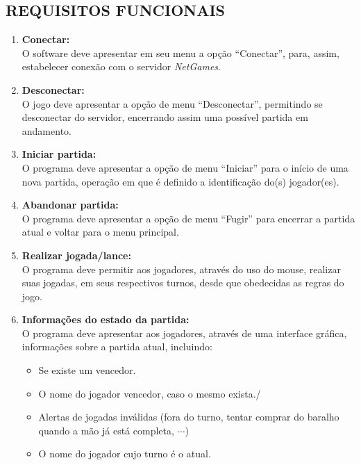 \documentclass[12pt,a4paper,brazil,abntex2]{article}
\begin{document}
	\subsection{\normalsize REQUISITOS FUNCIONAIS}
		
		\begin{enumerate}
			\item {\bf Conectar:}\\
				O software deve apresentar em seu menu a opção ``Conectar'', para, assim, estabelecer conexão com o servidor \textit{NetGames}.

			\item {\bf Desconectar:}\\
				O jogo deve apresentar a opção de menu ``Desconectar'', permitindo se desconectar do servidor, encerrando assim uma possível partida em andamento.
			
			\item {\bf Iniciar partida:}\\
				O programa deve apresentar a opção de menu ``Iniciar'' para o início de uma nova partida, operação em que é definido a identificação do(s) jogador(es).
			
			\item {\bf Abandonar partida:}\\
				O programa deve apresentar a opção de menu ``Fugir'' para encerrar a partida atual e voltar para o menu principal.

			\item {\bf Realizar jogada/lance:}\\
				O programa deve permitir aos jogadores, através do uso do mouse, realizar suas jogadas, em seus respectivos turnos, desde que obedecidas as regras do jogo.
			
			\item {\bf Informações do estado da partida:}\\
				O programa deve apresentar aos jogadores, através de uma interface gráfica, informações sobre a partida atual, incluindo:
					\begin{itemize}
						\item Se existe um vencedor.
						\item O nome do jogador vencedor, caso o mesmo exista./
						\item Alertas de jogadas inválidas (fora do turno, tentar comprar do baralho quando a mão já está completa, $\cdots$)
						\item O nome do jogador cujo turno é o atual.
					\end{itemize}
			
		\end{enumerate}
		
\end{document}
